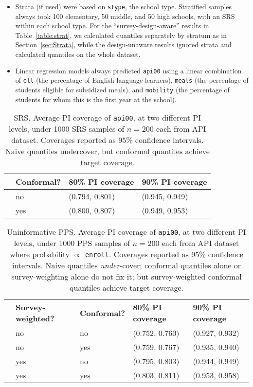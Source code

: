 \documentclass[10.5pt, letterpaper]{article}
\numberwithin{table}{section}
\numberwithin{figure}{section}
\numberwithin{equation}{section}
\begin{document}
\begin{itemize}
  \item Strata (if used) were based on \texttt{stype}, the school type. Stratified samples always took 100 elementary, 50 middle, and 50 high schools, with an SRS within each school type. For the ``survey-design-aware'' results in Table~\ref{table:strat}, we calculated quantiles separately by stratum as in Section~\ref{sec:Strata}, while the design-unaware results ignored strata and calculated quantiles on the whole dataset.
  \item Linear regression models always predicted \texttt{api00} using a linear combination of \texttt{ell} (the percentage of English language learners), \texttt{meals} (the percentage of students eligible for subsidized meals), and \texttt{mobility} (the percentage of students for whom this is the first year at the school).
\end{itemize}





\begin{table}[ht!]
\centering
\begin{tabular}{rlll}
  \hline
 & Conformal? & 80\% PI coverage & 90\% PI coverage \\
  \hline
  & no & (0.794, 0.801) & (0.945, 0.949) \\
  & yes & (0.800, 0.807) & (0.949, 0.953) \\
   \hline
\end{tabular}
\caption{SRS. Average PI coverage of \texttt{api00}, at two different PI levels, under 1000 SRS samples of $n=200$ each from API dataset. Coverages reported as 95\% confidence intervals. Naive quantiles undercover, but conformal quantiles achieve target coverage.}
\label{table:SRS}
\end{table}


\begin{table}[ht!]
\centering
\begin{tabular}{rllll}
  \hline
 & Survey-weighted? & Conformal? & 80\% PI coverage & 90\% PI coverage \\
  \hline
  & no & no & (0.752, 0.760) & (0.927, 0.932) \\
  & no & yes & (0.759, 0.767) & (0.935, 0.940) \\
  & yes & no & (0.795, 0.803) & (0.944, 0.949) \\
  & yes & yes & (0.803, 0.811) & (0.953, 0.958) \\
   \hline
\end{tabular}
\caption{Uninformative PPS. Average PI coverage of \texttt{api00}, at two different PI levels, under 1000 PPS samples of $n=200$ each from API dataset where probability $\propto$ \texttt{enroll}. Coverages reported as 95\% confidence intervals. Naive quantiles \emph{under}-cover; conformal quantiles alone or survey-weighting alone do not fix it; but survey-weighted conformal quantiles achieve target coverage.}
\label{table:PPS-api00}
\end{table}
\end{document}
